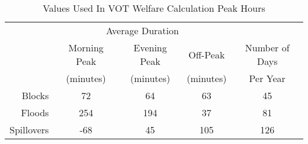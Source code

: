 \captionsetup{labelsep=newline}
\begin{table}[!htbp]
\centering

\caption{Values Used In VOT Welfare Calculation \newline Peak Hours}
\label{table:VOT-peak-desc}

		\begin{tabular}{r c c c c}
		    \hline
		    \hline
		    & \multicolumn{3}{c}{Average Duration} &  \\
		    & Morning Peak & Evening Peak & Off-Peak & Number of Days  \\
		    & (minutes) & (minutes) & (minutes) & Per Year \\
		    \hline
		    Blocks & 72 & 64 & 63 & 45 \\
		    Floods & 254 & 194 & 37 & 81 \\
		    Spillovers & -68 & 45 & 105 & 126 \\
		    \hline
		    \hline
		  \end{tabular}
\end{table} 
		 